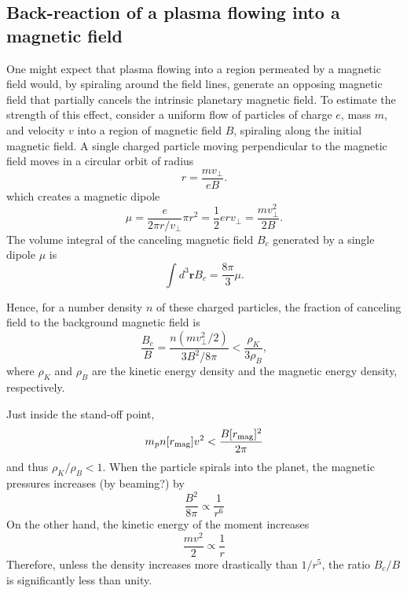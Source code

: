 \documentclass[iop,numberedappendix,apj]{emulateapj}
\begin{document}
\subsection{Back-reaction of a plasma flowing into a magnetic field}
\label{ss:offset}

One might expect that plasma flowing into a region permeated by a magnetic field would, by spiraling around the field lines, generate an opposing magnetic field that partially cancels the intrinsic planetary magnetic field. 
To estimate the strength of this effect, consider a uniform flow of particles of charge $e$, mass $m$, and velocity $v$ into a region of magnetic field $B$, spiraling along the initial magnetic field. 
A single charged particle moving perpendicular to the magnetic field moves in a circular orbit of radius 
\begin{equation}
r=\frac{mv_\bot }{eB}.
\end{equation}
which creates a magnetic dipole
\begin{equation}
\mu = \frac{e}{2\pi r/v_\bot} \pi r^2 = \frac{1}{2} e r v_\bot = \frac{mv_\bot^2}{2B}.
\end{equation}
The volume integral of the canceling magnetic field $B_c$ generated by a single dipole $\mu$ is
\begin{equation}
\int d^3{\boldsymbol r} B_c = \frac{8\pi}{3} \mu.
\end{equation}

Hence, for a number density $n$ of these charged particles, the fraction of canceling field to the background magnetic field is
\begin{equation}
\frac{B_c}{B} = \frac{n(mv_\bot^2/2)}{3 B^2/8\pi} < \frac{\rho_K}{3\rho_B},
\end{equation}
where $\rho_K$ and $\rho_B$ are the kinetic energy density and the magnetic energy density, respectively. 

Just inside the stand-off point, 
\begin{equation}
m_p n[r_{\rm mag}] v^2 < \frac{B[r_{\rm mag}]^2}{2\pi }
\end{equation}
and thus $\rho_K/\rho _B < 1$. 
When the particle spirals into the planet, 
the magnetic pressures increases (by beaming?) by 
\begin{equation}
\frac{B^2}{8\pi } \propto \frac{1}{r^6}
\end{equation}
On the other hand, the kinetic energy of the moment increases
\begin{equation}
\frac{mv^2}{2} \propto \frac{1}{r}
\end{equation}
Therefore, unless the density increases more drastically than $1/r^5$, the ratio $B_c/B$ is significantly less than unity. 
\end{document}
